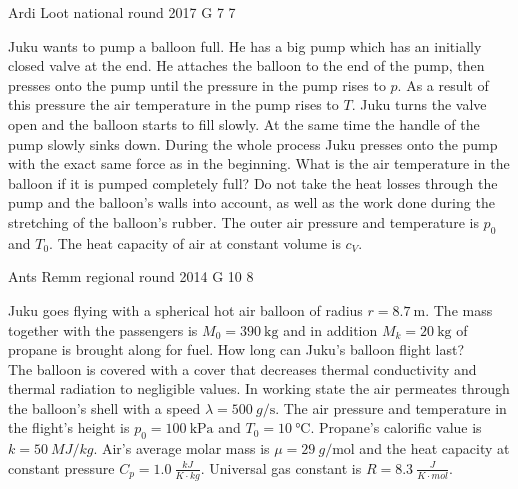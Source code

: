 \documentclass[11pt]{article}
\begin{document}
{Ardi Loot} %
{national round} %
{2017} %
{G 7} %
{7} %
{

\ifEngStatement
Juku wants to pump a balloon full. He has a big pump which has an initially closed valve at the end. He attaches the balloon to the end of the pump, then presses onto the pump until the pressure in the pump rises to $p$. As a result of this pressure the air temperature in the pump rises to $T$. Juku turns the valve open and the balloon starts to fill slowly. At the same time the handle of the pump slowly sinks down. During the whole process Juku presses onto the pump with the exact same force as in the beginning. What is the air temperature in the balloon if it is pumped completely full? Do not take the heat losses through the pump and the balloon’s walls into account, as well as the work done during the stretching of the balloon’s rubber. The outer air pressure and temperature is $p_0$ and $T_0$. The heat capacity of air at constant volume is $c_V$.
\fi
}

{Ants Remm} %
{regional round} %
{2014} %
{G 10} %
{8} %
{

\ifEngStatement
Juku goes flying with a spherical hot air balloon of radius $r = \SI{8.7}{\metre}$. The mass together with the passengers is $M_0= \SI{390}{\kg}$ and in addition $M_k = \SI{20}{\kg}$ of propane is brought along for fuel. How long can Juku's balloon flight last?\\ 
The balloon is covered with a cover that decreases thermal conductivity and thermal radiation to negligible values. In working state the air permeates through the balloon's shell with a speed $\lambda = \SI{500}{g\per\s}$. The air pressure and temperature in the flight's height is $p_0 = \SI{100}{\kilo\Pa}$ and $T_0 = \SI{10}{\celsius}$. Propane's calorific value is $k = \SI{50}{MJ/kg}$. Air's average molar mass is $\mu = \SI{29}{g\per\mole}$ and the heat capacity at constant pressure $C_p = \SI{1.0}{\frac{kJ}{K\cdot kg}}$. Universal gas constant is $R = \SI{8.3}{\frac{J}{K\cdot mol}}$.
\fi
}
\end{document}
